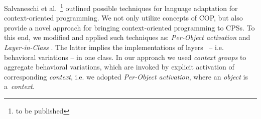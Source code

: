 Salvaneschi et al.~\cite{SalvaneschiTBP}\footnote{to be published}\cite{Salvaneschi12} 
outlined possible techniques for language adaptation for context-oriented
programming. We not only utilize concepts of COP, but also provide a novel approach for
bringing context-oriented programming to CPSs. To this end, we modified and
applied such techniques as: \emph{Per-Object activation} and
\emph{Layer-in-Class} \cite{Salvaneschi12}. The latter implies the
implementations of layers~\cite{Costanza05} -- i.e. behavioral variations -- in
one class. In our approach we used \emph{context groups} to aggregate behavioral
variations, which are invoked by explicit activation of corresponding
\emph{context}, i.e. we adopted \emph{Per-Object activation}, where an
\emph{object} is a~\emph{context}.
